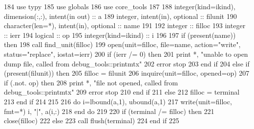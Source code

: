 \begin{DoxyCode}
184       \textcolor{keywordtype}{use }typy
185       \textcolor{keywordtype}{use }globals
186       \textcolor{keywordtype}{use }core_tools
187       
188       \textcolor{keywordtype}{integer(kind=ikind)}, \textcolor{keywordtype}{dimension(:,:)}, \textcolor{keywordtype}{intent(in out)} :: a
189       \textcolor{keywordtype}{integer}, \textcolor{keywordtype}{intent(in)}, \textcolor{keywordtype}{optional} :: filunit   
190       \textcolor{keywordtype}{character(len=*)}, \textcolor{keywordtype}{intent(in)}, \textcolor{keywordtype}{optional} :: name
191 
192       \textcolor{keywordtype}{integer} :: filloc
193       \textcolor{keywordtype}{integer} :: ierr
194       \textcolor{keywordtype}{logical} :: op
195       \textcolor{keywordtype}{integer(kind=ikind)} :: i
196       
197       \textcolor{keywordflow}{if} (\textcolor{keyword}{present}(name)) \textcolor{keywordflow}{then}
198         \textcolor{keyword}{call }find_unit(filloc)
199         \textcolor{keyword}{open}(unit=filloc, file=name, action=\textcolor{stringliteral}{"write"}, status=\textcolor{stringliteral}{"replace"}, iostat\textcolor{comment}{=ierr)}
200 \textcolor{comment}{        }\textcolor{keywordflow}{if} (ierr /= 0) \textcolor{keywordflow}{then}
201           print *, \textcolor{stringliteral}{"unable to open dump file, called from debug\_tools::printmtx"}
202           error stop
203 \textcolor{keywordflow}{        end if}
204       \textcolor{keywordflow}{else} \textcolor{keywordflow}{if} (\textcolor{keyword}{present}(filunit)) \textcolor{keywordflow}{then}
205         filloc = filunit
206         \textcolor{keyword}{inquire}(unit=filloc, opened=op)
207         \textcolor{keywordflow}{if} (.not. op) \textcolor{keywordflow}{then}
208           print *, \textcolor{stringliteral}{"file not opened, called from debug\_tools::printmtx"}
209           error stop
210 \textcolor{keywordflow}{        end if}
211       \textcolor{keywordflow}{else}
212         filloc = terminal
213 \textcolor{keywordflow}{      end if}
214       
215       
216       \textcolor{keywordflow}{do} i=lbound(a,1), ubound(a,1)
217         \textcolor{keyword}{write}(unit=filloc, fmt=*)  i, \textcolor{stringliteral}{"|"},  a(i,:)
218 \textcolor{keywordflow}{      end do}
219 
220       \textcolor{keywordflow}{if} (terminal /= filloc) \textcolor{keywordflow}{then}
221         \textcolor{keyword}{close}(filloc)
222       \textcolor{keywordflow}{else}
223         \textcolor{keyword}{call }flush(terminal)
224 \textcolor{keywordflow}{      end if}
225       
\end{DoxyCode}


